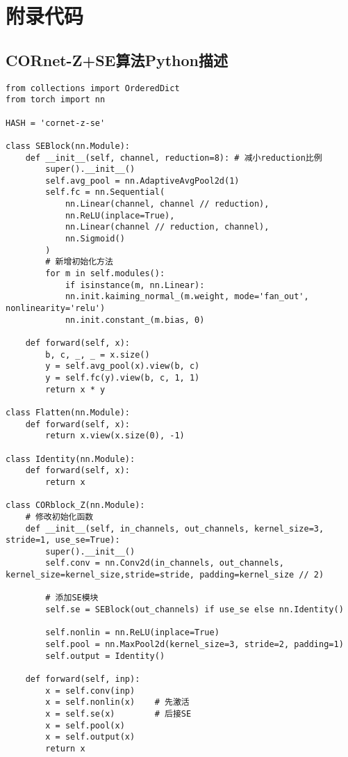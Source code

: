 \chapter{附录代码}

\section{CORnet-Z+SE算法Python描述}

\begin{lstlisting}
from collections import OrderedDict
from torch import nn
    
HASH = 'cornet-z-se'
    
class SEBlock(nn.Module):
    def __init__(self, channel, reduction=8): # 减小reduction比例
    	super().__init__()
    	self.avg_pool = nn.AdaptiveAvgPool2d(1)
    	self.fc = nn.Sequential(
            nn.Linear(channel, channel // reduction),
            nn.ReLU(inplace=True),
            nn.Linear(channel // reduction, channel),
            nn.Sigmoid()
    	)
    	# 新增初始化方法
    	for m in self.modules():
            if isinstance(m, nn.Linear):
            nn.init.kaiming_normal_(m.weight, mode='fan_out', nonlinearity='relu')
            nn.init.constant_(m.bias, 0)
    
    def forward(self, x):
    	b, c, _, _ = x.size()
    	y = self.avg_pool(x).view(b, c)
    	y = self.fc(y).view(b, c, 1, 1)
    	return x * y
    
class Flatten(nn.Module):
    def forward(self, x):
        return x.view(x.size(0), -1)
    
class Identity(nn.Module):
    def forward(self, x):
        return x
    
class CORblock_Z(nn.Module):
    # 修改初始化函数
    def __init__(self, in_channels, out_channels, kernel_size=3, stride=1, use_se=True):
        super().__init__()
        self.conv = nn.Conv2d(in_channels, out_channels, kernel_size=kernel_size,stride=stride, padding=kernel_size // 2)
    
        # 添加SE模块
        self.se = SEBlock(out_channels) if use_se else nn.Identity()
    
        self.nonlin = nn.ReLU(inplace=True)
        self.pool = nn.MaxPool2d(kernel_size=3, stride=2, padding=1)
        self.output = Identity()
    
    def forward(self, inp):
    	x = self.conv(inp)
    	x = self.nonlin(x)    # 先激活
    	x = self.se(x)        # 后接SE
    	x = self.pool(x)
    	x = self.output(x)
    	return x
    

\end{lstlisting}
